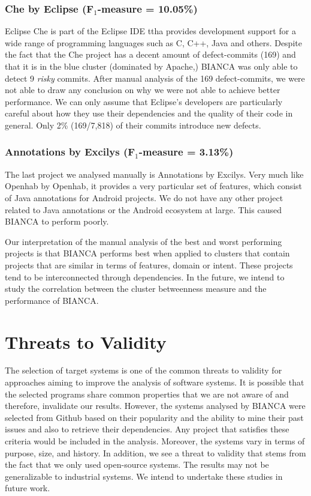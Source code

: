\subsubsection{\texorpdfstring{Che by Eclipse (F\(_1\)-measure =
10.05\%)}{Che by Eclipse (F\_1-measure = 10.05\%)}}\label{che-by-eclipse-f_1-measure-10.05}

Eclipse Che is part of the Eclipse IDE ttha provides development support
for a wide range of programming languages such as C, C++, Java and
others. Despite the fact that the Che project has a decent amount of
defect-commits (169) and that it is in the blue cluster (dominated by
Apache,) BIANCA was only able to detect 9 \emph{risky} commits. After
manual analysis of the 169 defect-commits, we were not able to draw any
conclusion on why we were not able to achieve better performance. We can
only assume that Eclipse's developers are particularly careful about how
they use their dependencies and the quality of their code in general.
Only 2\% (169/7,818) of their commits introduce new defects.

\subsubsection{\texorpdfstring{Annotations by Excilys (F\(_1\)-measure =
3.13\%)}{Annotations by Excilys (F\_1-measure = 3.13\%)}}\label{annotations-by-excilys-f_1-measure-3.13}

The last project we analysed manually is Annotations by Excilys. Very
much like Openhab by Openhab, it provides a very particular set of
features, which consist of Java annotations for Android projects. We do
not have any other project related to Java annotations or the Android
ecosystem at large. This caused BIANCA to perform poorly.

Our interpretation of the manual analysis of the best and worst
performing projects is that BIANCA performs best when applied to
clusters that contain projects that are similar in terms of features,
domain or intent. These projects tend to be interconnected through
dependencies. In the future, we intend to study the correlation between
the cluster betweenness measure and the performance of BIANCA.

\section{Threats to Validity}\label{sec:threats}

The selection of target systems is one of the common threats to validity
for approaches aiming to improve the analysis of software systems. It is
possible that the selected programs share common properties that we are
not aware of and therefore, invalidate our results. However, the systems
analysed by BIANCA were selected from Github based on their popularity
and the ability to mine their past issues and also to retrieve their
dependencies. Any project that satisfies these criteria would be
included in the analysis. Moreover, the systems vary in terms of
purpose, size, and history. In addition, we see a threat to validity
that stems from the fact that we only used open-source systems. The
results may not be generalizable to industrial systems. We intend to
undertake these studies in future work.

